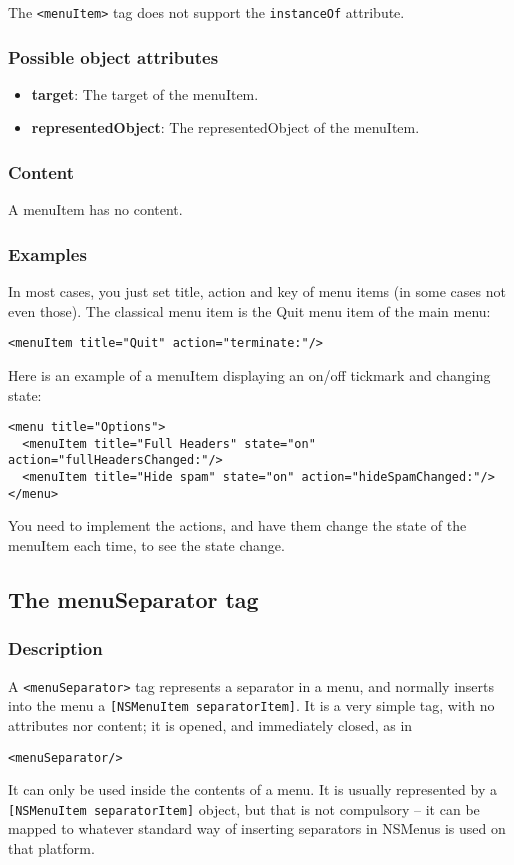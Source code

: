 The \texttt{<menuItem>} tag does not support the \texttt{instanceOf} attribute.

\subsubsection{Possible object attributes}
\begin{itemize}
\item {\bf target}: The target of the menuItem.
\item {\bf representedObject}: The representedObject of the menuItem.
\end{itemize}

\subsubsection{Content}
A menuItem has no content.

\subsubsection{Examples}
In most cases, you just set title, action and key of menu items (in
some cases not even those).  The classical menu item is the Quit menu
item of the main menu:
\begin{verbatim}
<menuItem title="Quit" action="terminate:"/>
\end{verbatim}
Here is an example of a menuItem displaying an on/off tickmark and
changing state:
\begin{verbatim}
<menu title="Options">
  <menuItem title="Full Headers" state="on" action="fullHeadersChanged:"/>
  <menuItem title="Hide spam" state="on" action="hideSpamChanged:"/>
</menu>
\end{verbatim}
You need to implement the actions, and have them change the state of the
menuItem each time, to see the state change.

\subsection{The menuSeparator tag}

\subsubsection{Description}
A \texttt{<menuSeparator>} tag represents a separator in a menu, and
normally inserts into the menu a \texttt{[NSMenuItem separatorItem]}.
It is a very simple tag, with no attributes nor content; it is opened,
and immediately closed, as in
\begin{verbatim}
<menuSeparator/>
\end{verbatim}
It can only be used inside the contents of a menu.  It is usually
represented by a \texttt{[NSMenuItem separatorItem]} object, but that
is not compulsory -- it can be mapped to whatever standard way of
inserting separators in NSMenus is used on that platform.

